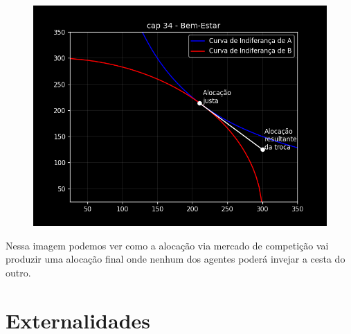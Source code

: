 \documentclass[a4paper,11pt,oneside]{book}
\theoremstyle{definition}
\theoremstyle{break}
\begin{document}
\begin{figure}[H]
	\centering
	\includegraphics[scale=0.55]{cap34_6-inveja_equidade.png}
\end{figure}

Nessa imagem podemos ver como a alocação via mercado de competição vai produzir uma alocação final onde nenhum dos agentes poderá invejar a cesta do outro.

\chapter{Externalidades}
\end{document}
